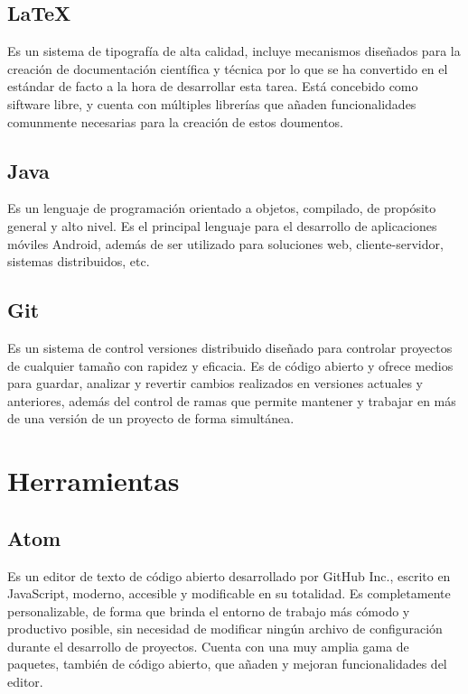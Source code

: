 \documentclass{article}
\begin{document}
    \subsection{\LaTeX}
    Es un sistema de tipografía de alta calidad, incluye mecanismos diseñados para la creación de documentación científica y técnica por lo que se ha convertido en el estándar de facto a la hora de desarrollar esta tarea. Está concebido como siftware libre, y cuenta con múltiples librerías que añaden funcionalidades comunmente necesarias para la creación de estos doumentos.

    \subsection{Java}
    Es un lenguaje de programación orientado a objetos, compilado, de propósito general y alto nivel. Es el principal lenguaje para el desarrollo de aplicaciones móviles Android, además de ser utilizado para soluciones web, cliente-servidor, sistemas distribuidos, etc. 

    \subsection{Git}
    Es un sistema de control versiones distribuido diseñado para controlar proyectos de cualquier tamaño con rapidez y eficacia. Es de código abierto y ofrece medios para guardar, analizar y revertir cambios realizados en versiones actuales y anteriores, además del control de ramas que permite mantener y trabajar en más de una versión de un proyecto de forma simultánea.

\section{Herramientas} 

    \subsection{Atom}
    Es un editor de texto de código abierto desarrollado por GitHub Inc., escrito en JavaScript, moderno, accesible y modificable en su totalidad. Es completamente personalizable, de forma que brinda el entorno de trabajo más cómodo y productivo posible, sin necesidad de modificar ningún archivo de configuración durante el desarrollo de proyectos. Cuenta con una muy amplia gama de paquetes, también de código abierto, que añaden y mejoran funcionalidades del editor.
\end{document}
